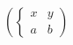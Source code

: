 \documentclass{article}
\begin{document}

$( \begin{cases} x & y \\ a & b \end{cases} )$
\end{document}

